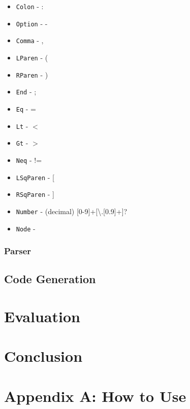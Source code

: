 \documentclass[a4paper]{report}
\begin{document}
\begin{itemize}
\item \texttt{Colon} - : 
\item \texttt{Option} - -
\item \texttt{Comma} - ,
\item \texttt{LParen} - (
\item \texttt{RParen} - )
\item \texttt{End} - ;
\item \texttt{Eq} - =
\item \texttt{Lt} - $<$
\item \texttt{Gt} - $>$
\item \texttt{Neq} - !=
\item \texttt{LSqParen} - [
\item \texttt{RSqParen} - ]
\item \texttt{Number} - (decimal)  [0-9]+[\textbackslash.[0.9]+]?
\item \texttt{Node} - 
\end{itemize}
\subsection{Parser}

\section{Code Generation}

\chapter{Evaluation}

\chapter{Conclusion}

\chapter{Appendix A: How to Use}


\end{document}
